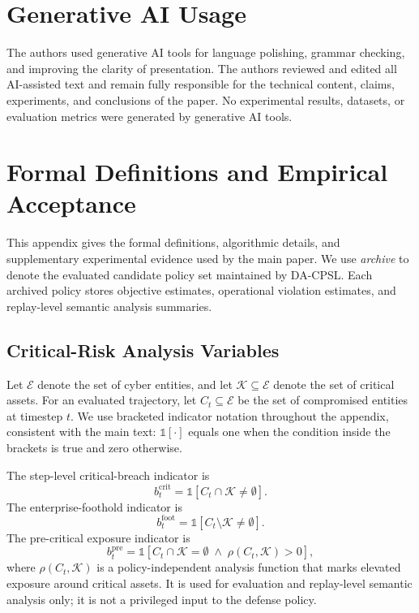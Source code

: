 \documentclass[sigconf,review,anonymous]{acmart}
\begin{document}
\section{Generative AI Usage}
\label{app:generative-ai-usage}

The authors used generative AI tools for language polishing, grammar
checking, and improving the clarity of presentation. The authors reviewed
and edited all AI-assisted text and remain fully responsible for the
technical content, claims, experiments, and conclusions of the paper.
No experimental results, datasets, or evaluation metrics were generated
by generative AI tools.


\section{Formal Definitions and Empirical Acceptance}
\label{app:formal-acceptance}

This appendix gives the formal definitions, algorithmic details, and
supplementary experimental evidence used by the main paper. We use
\emph{archive} to denote the evaluated candidate policy set maintained by
DA-CPSL. Each archived policy stores objective estimates, operational
violation estimates, and replay-level semantic analysis summaries.

\subsection{Critical-Risk Analysis Variables}
\label{app:critical-audit}

Let \(\mathcal{E}\) denote the set of cyber entities, and let
\(\mathcal{K}\subseteq\mathcal{E}\) denote the set of critical assets.
For an evaluated trajectory, let \(C_t\subseteq\mathcal{E}\) be the set
of compromised entities at timestep \(t\). We use bracketed indicator
notation throughout the appendix, consistent with the main text:
\(\mathbb{1}[\cdot]\) equals one when the condition inside the brackets
is true and zero otherwise.

The step-level critical-breach indicator is
\begin{equation}
 b_t^{\mathrm{crit}}
 =
 \mathbb{1}\!\left[
 C_t\cap\mathcal{K}\neq\emptyset
 \right].
 \label{eq:app-critical-breach}
\end{equation}
The enterprise-foothold indicator is
\begin{equation}
 b_t^{\mathrm{foot}}
 =
 \mathbb{1}\!\left[
 C_t\setminus\mathcal{K}\neq\emptyset
 \right].
 \label{eq:app-enterprise-foothold}
\end{equation}
The pre-critical exposure indicator is
\begin{equation}
 b_t^{\mathrm{pre}}
 =
 \mathbb{1}\!\left[
 C_t\cap\mathcal{K}=\emptyset
 \;\wedge\;
 \rho(C_t,\mathcal{K})>0
 \right],
 \label{eq:app-precritical}
\end{equation}
where \(\rho(C_t,\mathcal{K})\) is a policy-independent analysis function
that marks elevated exposure around critical assets. It is used for
evaluation and replay-level semantic analysis only; it is not a
privileged input to the defense policy.
\end{document}

